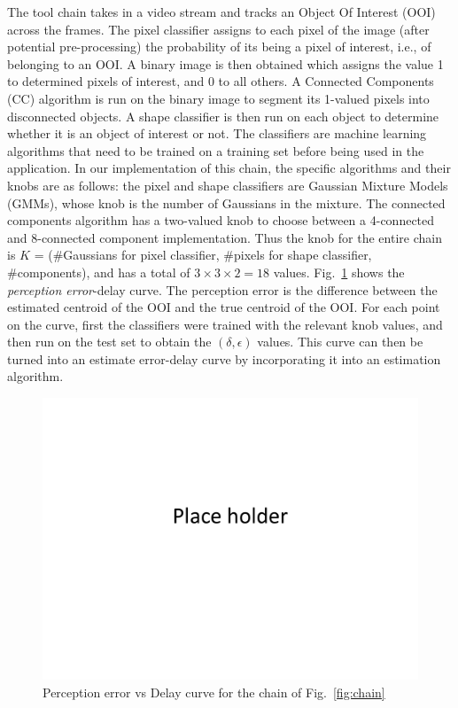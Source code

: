 The tool chain takes in a video stream and tracks an Object Of Interest (OOI) across the frames.
The pixel classifier assigns to each pixel of the image (after potential pre-processing) the probability of its being a pixel of interest, i.e., of belonging to an OOI. 
A binary image is then obtained which assigns the value 1 to determined pixels of interest, and 0 to all others. 
A Connected Components (CC) algorithm is run on the binary image to segment its 1-valued pixels into disconnected objects.
A shape classifier is then run on each object to determine whether it is an object of interest or not.
The classifiers are machine learning algorithms that need to be trained on a training set before being used in the application.
In our implementation of this chain, the specific algorithms and their knobs are as follows:
the pixel and shape classifiers are Gaussian Mixture Models (GMMs), whose knob is the number of Gaussians in the mixture.
The connected components algorithm has a two-valued knob to choose between a 4-connected and 8-connected component implementation.
Thus the knob for the entire chain is $K$ = (\#Gaussians for pixel classifier, \#pixels for shape classifier, \#components), and has a total of $3 \times 3 \times 2 = 18$ values.
Fig.~\ref{fig:perceptionErrorVsDelay} shows the \emph{perception error}-delay curve.
The perception error is the difference between the estimated centroid of the OOI and the true centroid of the OOI.
For each point on the curve, first the classifiers were trained with the relevant knob values, and then run on the test set to obtain the $(\delta,\epsilon)$ values.
This curve can then be turned into an estimate error-delay curve by incorporating it into an estimation algorithm.
\begin{figure}[t]
	\centering
	\includegraphics[width=0.7\linewidth]{figures/placeHolder}
	\caption{Perception error vs Delay curve for the chain of Fig.~\ref{fig:chain}}
	\label{fig:perceptionErrorVsDelay}
\end{figure}

